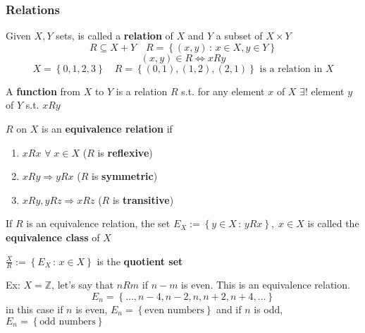     \subsubsection*{Relations}
    Given \(X, Y\) sets, is called a \textbf{relation} of \(X\) and \(Y\) a subset of \(X \times Y\)
    \[
        R \subseteq X + Y \quad R = \left\lbrace (x,y) \, : \, x \in X, y \in Y \right\rbrace
    \]
    \[
        (x,y) \in R \Leftrightarrow xRy
    \]
    \[
        X = \left\lbrace 0,1,2,3 \right\rbrace \quad R = \left\lbrace (0,1), (1,2), (2,1) \right\rbrace \mbox{ is a relation in } X
    \]
\begin{definition}
    A \textbf{function} from \(X\) to \(Y\) is a relation \(R\) s.t. for any element \(x\) of \(X\) \(\exists !\) element \(y\) of \(Y\) s.t. \(xRy\)
\end{definition}
\begin{definition}
    \(R\) on \(X\) is an \textbf{equivalence relation} if 
    \begin{enumerate}
        \item \(xRx\) \(\forall \; x \in X\) (\(R\) is \textbf{reflexive})
        \item \(xRy \Rightarrow yRx\) (\(R\) is \textbf{symmetric})
        \item \(xRy, yRz \Rightarrow xRz\) (\(R\) is \textbf{transitive})
    \end{enumerate}
    If \(R\) is an equivalence relation, the set 
    \(
        E_X := \left\lbrace y \in X \, : \, yRx \right\rbrace, \; x \in X
    \)
    is called the \textbf{equivalence class} of \(X\)
\end{definition}
\begin{definition}
    \(\frac{X}{R} := \left\lbrace E_X \, : \, x \in X \right\rbrace\) is the \textbf{quotient set}
\end{definition}
Ex: \(X = \mathbb{Z}\), let's say that \(nRm\) if \(n-m\) is even. This is an equivalence relation.
\[
    E_n = \left\lbrace \ldots, n-4, n-2, n, n+2, n+4, \ldots \right\rbrace
\]
in this case if \(n\) is even, \(E_n = \left\lbrace \mbox{even numbers} \right\rbrace\) and if \(n\) is odd, \(E_n = \left\lbrace \mbox{odd numbers} \right\rbrace\)
